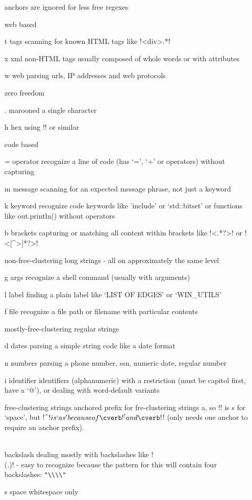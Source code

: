 \begin{itemize}
anchors are ignored for less free regexes

web based
\item[ t ] tags      scanning for known HTML tags like \cverb!<div>.*!
\item[ x ] xml       non-HTML tags usually composed of whole words or with attributes
\item[ w ] web       parsing urls, IP addresses and web protocols

zero freedom
\item[ . ] marooned      a single character
\item[ h ] hex           using \cverb!\x[a-f0-9][a-f0-9]! or similar

code based
\item[ = ] operator  recognize a line of code (has `=', `+' or operators) without capturing
\item[ m ] message     scanning for an expected message phrase, not just a keyword
\item[ k ] keyword   recognize code keywords like 'include' or `std::bitset' or functions like out.println() without operators
\item[ b ] brackets  capturing or matching all content within brackets like \cverb!<.*?>! or \cverb!<[^>]*?>!


non-free-clustering long strings - all on approximately the same level
\item[ g ] args       recognize a shell command (usually with arguments)
\item[ l ] label     finding a plain label like `LIST OF EDGES' or `WIN_UTILS'
\item[ f ] file       recognize a file path or filename with particular contents

mostly-free-clustering regular strings

\item[ d ] dates         parsing a simple string code like a date format
\item[ n ] numbers       parsing a phone number, ssn, numeric date, regular number
\item[ i ] identifier    identifiers (alphanumeric) with a restriction (must be capitol first, have a `@'), or dealing with word-default variants

free-clustering strings
anchored prefix for fre-clustering strings a, so \cverb!\s*! is s for `space', but \cverb!^\s*$! is `as' because of \cverb!^! and \cverb!$! (only needs one anchor to require an anchor prefix).
\item[ \\ ] backslash    dealing mostly with backslashes like \cverb!\\(.)! - easy to recognize because the pattern for this will contain four backslashes: \verb!"\\\\"!
\item[ s ] space         whitespace only


\end{itemize}
